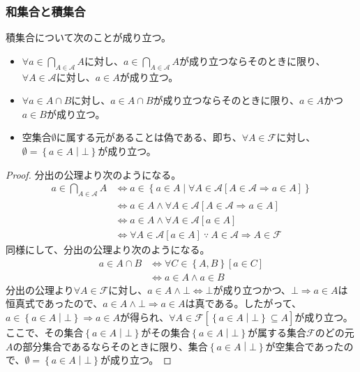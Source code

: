 \documentclass[a4paper]{jsarticle}
\begin{document}
\subsubsection{和集合と積集合}%
\begin{thm}
\label{1.2.1.10}
積集合について次のことが成り立つ。
\begin{itemize}
\item
  $\forall a \in \bigcap_{A \in \mathcal{A}} A$に対し、$a \in \bigcap_{A \in \mathcal{A}} A$が成り立つならそのときに限り、$\forall A \in \mathcal{A}$に対し、$a \in A$が成り立つ。
\item
  $\forall a \in A \cap B$に対し、$a \in A \cap B$が成り立つならそのときに限り、$a \in A$かつ$a \in B$が成り立つ。
\item
  空集合$\emptyset$に属する元があることは偽である、即ち、$\forall A\in \mathcal{F}$に対し、$\emptyset = \left\{ a \in A \middle| \bot \right\}$が成り立つ。
\end{itemize}
\end{thm}
\begin{proof}
分出の公理より次のようになる。
\begin{align*}
a \in \bigcap_{A \in \mathcal{A}} A &\Leftrightarrow a \in \left\{ a \in A \middle| \forall A \in \mathcal{A}\left[ A \in \mathcal{A \Rightarrow}a \in A \right] \right\} \\
&\Leftrightarrow a \in A \land \forall A \in \mathcal{A}\left[ A \in \mathcal{A \Rightarrow}a \in A \right] \\
&\Leftrightarrow a \in A \land \forall A \in \mathcal{A}[ a \in A] \\
&\Leftrightarrow \forall A \in \mathcal{A}[ a \in A]\ \because\ A \in \mathcal{A \Rightarrow}A\in \mathcal{F}
\end{align*}
同様にして、分出の公理より次のようになる。
\begin{align*}
a \in A \cap B &\Leftrightarrow \forall C \in \left\{ A,B \right\}[ a \in C] \\
&\Leftrightarrow a \in A \land a \in B
\end{align*}
分出の公理より$\forall A\in \mathcal{F}$に対し、$a \in A \land \bot \Leftrightarrow \bot$が成り立つかつ、$\bot \Rightarrow a \in A$は恒真式であったので、$a \in A \land \bot \Rightarrow a \in A$は真である。したがって、$a \in \left\{ a \in A \middle| \bot \right\} \Rightarrow a \in A$が得られ、$\forall A\in \mathcal{F}\left[ \left\{ a \in A \middle| \bot \right\} \subseteq A \right]$が成り立つ。ここで、その集合$\left\{ a \in A \middle| \bot \right\}$がその集合$\left\{ a \in A \middle| \bot \right\}$が属する集合$\mathcal{F}$のどの元$A$の部分集合であるならそのときに限り、集合$\left\{ a \in A \middle| \bot \right\}$が空集合であったので、$\emptyset = \left\{ a \in A \middle| \bot \right\}$が成り立つ。
\end{proof}
\end{document}
